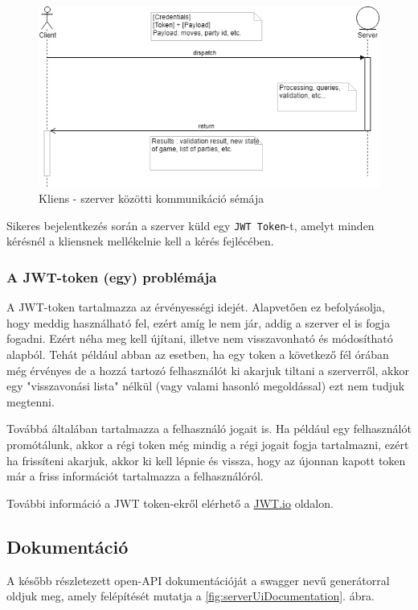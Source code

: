 \documentclass[twoside, a4paper, 12pt]{book}
\begin{document}
\begin{figure}[htbp]
	\centering
	\includegraphics[width=1.0\textwidth]{img/clientServerCommunication.png}
	\caption{Kliens - szerver közötti kommunikáció sémája}
	\label{fig:clientServerCommunication}
\end{figure}

Sikeres bejelentkezés során a szerver küld egy \texttt{JWT Token}-t, amelyt minden kérésnél a kliensnek mellékelnie kell a kérés fejlécében.

\subsubsection{A JWT-token (egy) problémája}
A JWT-token tartalmazza az érvényességi idejét. Alapvetően ez befolyásolja, hogy meddig használható fel, ezért amíg le nem jár, addig a szerver el is fogja fogadni. Ezért néha meg kell újítani, illetve nem visszavonható és módosítható alapból. Tehát például abban az esetben, ha egy token a következő fél órában még érvényes de a hozzá tartozó felhasználót ki akarjuk tiltani a szerverről, akkor egy "visszavonási lista" nélkül (vagy valami hasonló megoldással) ezt nem tudjuk megtenni.

Továbbá általában tartalmazza a felhasználó jogait is. Ha például egy felhasználót promótálunk, akkor a régi token még mindig a régi jogait fogja tartalmazni, ezért ha frissíteni akarjuk, akkor ki kell lépnie és vissza, hogy az újonnan kapott token már a friss információt tartalmazza a felhasználóról.

További információ a JWT token-ekről elérhető a \href{https://jwt.io/}{JWT.io} oldalon.

\subsection{Dokumentáció}
A később részletezett open-API dokumentációját a swagger nevű generátorral oldjuk meg, amely felépítését mutatja a \ref{fig:serverUiDocumentation}. ábra.
\end{document}
